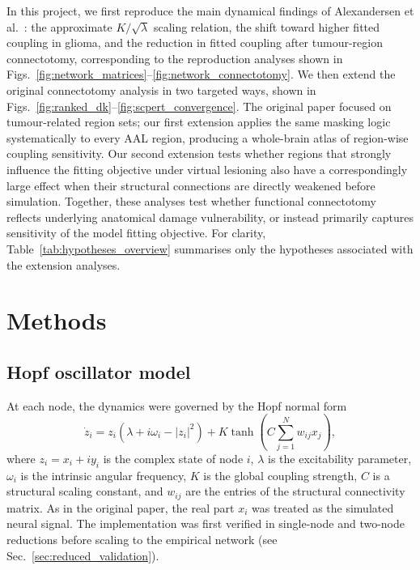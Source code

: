 \documentclass[11pt, reprint, aps, prl, floatfix, secnumarabic]{revtex4-2}
\begin{document}
In this project, we first reproduce the main dynamical findings of Alexandersen et al.~\cite{Alexandersen2025}: the approximate $K/\sqrt{\lambda}$ scaling relation, the shift toward higher fitted coupling in glioma, and the reduction in fitted coupling after tumour-region connectotomy, corresponding to the reproduction analyses shown in Figs.~\ref{fig:network_matrices}--\ref{fig:network_connectotomy}. We then extend the original connectotomy analysis in two targeted ways, shown in Figs.~\ref{fig:ranked_dk}--\ref{fig:scpert_convergence}. The original paper focused on tumour-related region sets; our first extension applies the same masking logic systematically to every AAL region, producing a whole-brain atlas of region-wise coupling sensitivity. Our second extension tests whether regions that strongly influence the fitting objective under virtual lesioning also have a correspondingly large effect when their structural connections are directly weakened before simulation. Together, these analyses test whether functional connectotomy reflects underlying anatomical damage vulnerability, or instead primarily captures sensitivity of the model fitting objective.
For clarity, Table~\ref{tab:hypotheses_overview} summarises only the hypotheses associated with the extension analyses.

\section{Methods}
\subsection{Hopf oscillator model}
At each node, the dynamics were governed by the Hopf normal form
\begin{equation}
\dot{z}_i = z_i\left(\lambda + i\omega_i - |z_i|^2\right)
+ K \tanh\!\left(C \sum_{j=1}^{N} w_{ij} x_j\right),
\end{equation}
where $z_i = x_i + i y_i$ is the complex state of node $i$, $\lambda$ is the excitability parameter, $\omega_i$ is the intrinsic angular frequency, $K$ is the global coupling strength, $C$ is a structural scaling constant, and $w_{ij}$ are the entries of the structural connectivity matrix. As in the original paper, the real part $x_i$ was treated as the simulated neural signal. The implementation was first verified in single-node and two-node reductions before scaling to the empirical network (see Sec.~\ref{sec:reduced_validation}).
\end{document}
